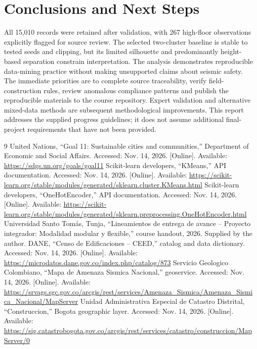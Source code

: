 \documentclass[conference]{IEEEtran}
\begin{document}
\section{Conclusions and Next Steps}
All 15,010 records were retained after validation, with 267 high-floor observations explicitly flagged for source review. The selected two-cluster baseline is stable to tested seeds and clipping, but its limited silhouette and predominantly height-based separation constrain interpretation. The analysis demonstrates reproducible data-mining practice without making unsupported claims about seismic safety.
The immediate priorities are to complete source traceability, verify field-construction rules, review anomalous compliance patterns and publish the reproducible materials to the course repository. Expert validation and alternative mixed-data methods are subsequent methodological improvements. This report addresses the supplied progress guidelines; it does not assume additional final-project requirements that have not been provided.
\begin{thebibliography}{9}
 United Nations, ``Goal 11: Sustainable cities and communities,'' Department of Economic and Social Affairs. Accessed: Nov. 14, 2026. [Online]. Available: \url{https://sdgs.un.org/goals/goal11}
 Scikit-learn developers, ``KMeans,'' API documentation. Accessed: Nov. 14, 2026. [Online]. Available: \url{https://scikit-learn.org/stable/modules/generated/sklearn.cluster.KMeans.html}
 Scikit-learn developers, ``OneHotEncoder,'' API documentation. Accessed: Nov. 14, 2026. [Online]. Available: \url{https://scikit-learn.org/stable/modules/generated/sklearn.preprocessing.OneHotEncoder.html}
 Universidad Santo Tomás, Tunja, ``Lineamientos de entrega de avance -- Proyecto integrador: Modalidad modular y flexible,'' course handout, 2026. Supplied by the author.
 DANE, ``Censo de Edificaciones -- CEED,'' catalog and data dictionary. Accessed: Nov. 14, 2026. [Online]. Available: \url{https://microdatos.dane.gov.co/index.php/catalog/873}
 Servicio Geologico Colombiano, ``Mapa de Amenaza Sismica Nacional,'' geoservice. Accessed: Nov. 14, 2026. [Online]. Available: \url{https://srvags.sgc.gov.co/arcgis/rest/services/Amenaza_Sismica/Amenaza_Sismica_Nacional/MapServer}
 Unidad Administrativa Especial de Catastro Distrital, ``Construccion,'' Bogota geographic layer. Accessed: Nov. 14, 2026. [Online]. Available: \url{https://sig.catastrobogota.gov.co/arcgis/rest/services/catastro/construccion/MapServer/0}
\end{thebibliography}
\end{document}
